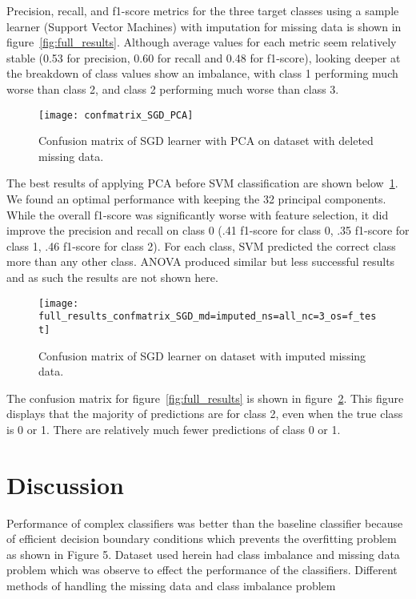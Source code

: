 \documentclass[conference]{IEEEtran}
\begin{document}
Precision, recall, and f1-score metrics for the three target classes using a sample learner (Support Vector Machines) with imputation for missing data is shown in figure~\ref{fig:full_results}. Although average values for each metric seem relatively stable (0.53 for precision, 0.60 for recall and 0.48 for f1-score), looking deeper at the breakdown of class values show an imbalance, with class 1 performing much worse than class 2, and class 2 performing much worse than class 3.

\begin{figure}[htpb]
	\centering
	\texttt{[image: confmatrix\_SGD\_PCA]}
	\caption{Confusion matrix of SGD learner with PCA on dataset with deleted missing data.}
	\label{fig:sgd_pca_results}
\end{figure}

The best results of applying PCA before SVM classification are shown below~\ref{fig:sgd_pca_results}. We found an optimal performance with keeping the 32 principal components. While the overall f1-score was significantly worse with feature selection, it did improve the precision and recall on class 0 (.41 f1-score for class 0, .35 f1-score for class 1, .46 f1-score for class 2). For each class, SVM predicted the correct class more than any other class. ANOVA produced similar but less successful results and as such the results are not shown here.

\begin{figure}[htpb]
	\centering
	\texttt{[image: full\_results\_confmatrix\_SGD\_md=imputed\_ns=all\_nc=3\_os=f\_test]}
	\caption{Confusion matrix of SGD learner on dataset with imputed missing data.}
	\label{fig:full_results_cm}
\end{figure}

The confusion matrix for figure~\ref{fig:full_results} is shown in figure~\ref{fig:full_results_cm}. This figure displays that the majority of predictions are for class 2, even when the true class is 0 or 1. There are relatively much fewer predictions of class 0 or 1.

\section{Discussion}

Performance of complex classifiers was better than the baseline classifier because of efficient decision boundary conditions which prevents the overfitting problem as shown in Figure 5. Dataset used herein had class imbalance and missing data problem which was observe to effect the performance of the classifiers. Different methods of handling the missing data and class imbalance problem 
\end{document}
